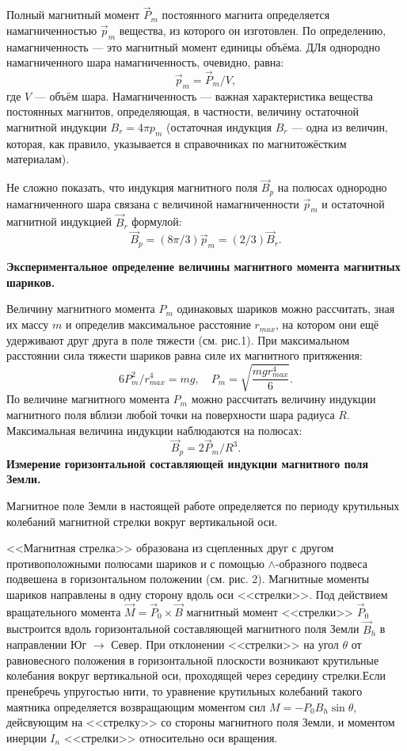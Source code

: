 \documentclass[a4paper, fontsize=14pt]{article}
\begin{document}
		Полный магнитный момент $\vec P_m$ постоянного магнита определяется намагниченностью $\vec p_m$ вещества, из которого он изготовлен. По определению, намагниченность --- это магнитный момент единицы объёма. ДЛя однородно намагниченного шара намагниченность, очевидно, равна:
\[
	\vec p_m = \vec P_m / V,
\]		
	где $V$ --- объём шара.
		 Намагниченность --- важная характеристика вещества постоянных магнитов, определяющая, в частности, величину остаточной магнитной индукции $B_r = 4 \pi p_m$ (остаточная индукция $B_r$ --- одна из величин, которая, как правило, указывается в справочниках по магнитожёстким материалам).
		 
		 Не сложно показать, что индукция магнитного поля $\vec B_p$ на полюсах однородно намагниченного шара связана с величиной намагниченности $\vec p_m$ и остаточной магнитной индукцией $\vec B_r$ формулой:
\[
	\vec B_p = (8 \pi / 3) \vec p_m = (2 / 3) \vec B_r.
\]
		
	\textbf{Экспериментальное  определение  величины  магнитного момента магнитных шариков.}	
	
Величину магнитного момента $P_m$ одинаковых шариков можно рассчитать, зная их массу $m$ и определив максимальное расстояние $r_{max}$, на котором они ещё удерживают друг друга в поле тяжести (см. рис.1). При максимальном расстоянии сила тяжести шариков равна силе их магнитного притяжения:
\[
	6 P_m^2 / r_{max}^4 = mg, \quad P_m = \sqrt{\frac{mgr_{max}^4}{6}}.
\]
По величине магнитного момента $P_m$ можно рассчитать величину индукции магнитного поля вблизи любой точки на поверхности шара радиуса $R$. Максимальная величина индукции наблюдаются на полюсах:
\[
	\vec B_p = 2 \vec P_m / R^3.
\]
 \textbf{Измерение горизонтальной составляющей индукции магнитного поля Земли.}
 
 Магнитное поле Земли в настоящей работе определяется по периоду крутильных колебаний магнитной стрелки вокруг вертикальной оси.
 
 <<Магнитная стрелка>> образована из сцепленных друг с другом противоположными полюсами шариков и с помощью $\wedge$-образного подвеса  подвешена  в  горизонтальном  положении (см. рис. 2). Магнитные моменты шариков направлены в одну сторону  вдоль  оси  <<стрелки>>.
 Под действием вращательного момента $\vec M = \vec P_0 \times \vec B$ магнитный момент <<стрелки>> $\vec P_0$ выстроится вдоль горизонтальной составляющей магнитного поля Земли $\vec B_h$ в направлении Юг $\rightarrow$ Север. При отклонении <<стрелки>> на угол $\theta$ от равновесного положения в горизонтальной плоскости возникают крутильные колебания вокруг вертикальной оси, проходящей через середину стрелки.Если пренебречь упругостью нити, то уравнение крутильных колебаний такого  маятника определяется возвращающим  моментом  сил 
 $M = - P_0 B_h \sin \theta$, дейсвующим на <<стрелку>> со стороны магнитного поля Земли, и моментом инерции $I_n$ <<стрелки>> относительно оси вращения.
 
\end{document}
